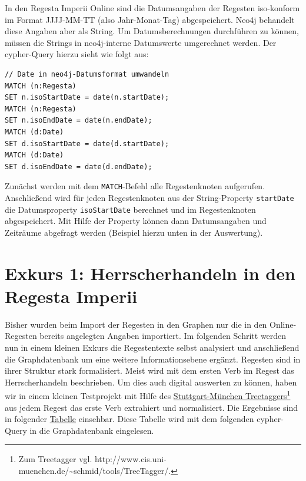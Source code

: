 \documentclass[ngerman,]{scrreprt}
\begin{document}
In den Regesta Imperii Online sind die Datumsangaben der Regesten iso-konform im Format JJJJ-MM-TT (also Jahr-Monat-Tag) abgespeichert. Neo4j behandelt diese Angaben aber als String. Um Datumsberechnungen durchführen zu können, müssen die Strings in neo4j-interne Datumswerte umgerechnet werden. Der cypher-Query hierzu sieht wie folgt aus:

\begin{verbatim}
// Date in neo4j-Datumsformat umwandeln
MATCH (n:Regesta)
SET n.isoStartDate = date(n.startDate);
MATCH (n:Regesta)
SET n.isoEndDate = date(n.endDate);
MATCH (d:Date)
SET d.isoStartDate = date(d.startDate);
MATCH (d:Date)
SET d.isoEndDate = date(d.endDate);
\end{verbatim}

Zunächst werden mit dem \texttt{MATCH}-Befehl alle Regestenknoten aufgerufen. Anschließend wird für jeden Regestenknoten aus der String-Property \texttt{startDate} die Datumsproperty \texttt{isoStartDate} berechnet und im Regestenknoten abgespeichert. Mit Hilfe der Property können dann Datumsangaben und Zeiträume abgefragt werden (Beispiel hierzu unten in der Auswertung).

\hypertarget{exkurs-1-herrscherhandeln-in-den-regesta-imperii}{%
\section{Exkurs 1: Herrscherhandeln in den Regesta Imperii}\label{exkurs-1-herrscherhandeln-in-den-regesta-imperii}}

Bisher wurden beim Import der Regesten in den Graphen nur die in den Online-Regesten bereits angelegten Angaben importiert. Im folgenden Schritt werden nun in einem kleinen Exkurs die Regestentexte selbst analysiert und anschließend die Graphdatenbank um eine weitere Informationsebene ergänzt. Regesten sind in ihrer Struktur stark formalisiert. Meist wird mit dem ersten Verb im Regest das Herrscherhandeln beschrieben. Um dies auch digital auswerten zu können, haben wir in einem kleinen Testprojekt mit Hilfe des \href{http://www.cis.uni-muenchen.de/~schmid/tools/TreeTagger/}{Stuttgart-München Treetaggers}\footnote{Zum Treetagger vgl. http://www.cis.uni-muenchen.de/\textasciitilde{}schmid/tools/TreeTagger/.} aus jedem Regest das erste Verb extrahiert und normalisiert. Die Ergebnisse sind in folgender \href{https://docs.google.com/spreadsheets/d/1nlbZmQYcT1E3Z58yPmcnulcNQc1e3111Di-4huhV-FY/edit?usp=sharing}{Tabelle} einsehbar. Diese Tabelle wird mit dem folgenden cypher-Query in die Graphdatenbank eingelesen.
\end{document}
